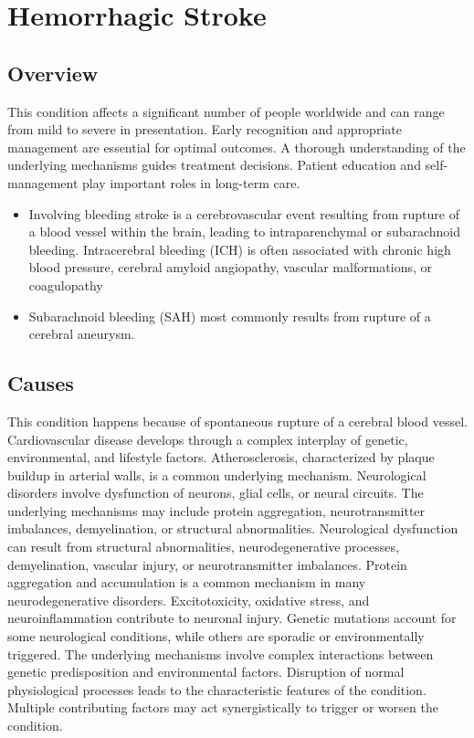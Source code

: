 \chapter{Hemorrhagic Stroke}
\label{sec:Hemorrhagic Stroke}

\section{Overview}
This condition affects a significant number of people worldwide and can range from mild to severe in presentation. Early recognition and appropriate management are essential for optimal outcomes. A thorough understanding of the underlying mechanisms guides treatment decisions. Patient education and self-management play important roles in long-term care.

\begin{itemize}[noitemsep]
  \item Involving bleeding stroke is a cerebrovascular event resulting from rupture of a blood vessel within the brain, leading to intraparenchymal or subarachnoid bleeding. Intracerebral bleeding (ICH) is often associated with chronic high blood pressure, cerebral amyloid angiopathy, vascular malformations, or coagulopathy
  \item Subarachnoid bleeding (SAH) most commonly results from rupture of a cerebral aneurysm.
\end{itemize}
\section{Causes}
This condition happens because of spontaneous rupture of a cerebral blood vessel. Cardiovascular disease develops through a complex interplay of genetic, environmental, and lifestyle factors. Atherosclerosis, characterized by plaque buildup in arterial walls, is a common underlying mechanism. Neurological disorders involve dysfunction of neurons, glial cells, or neural circuits. The underlying mechanisms may include protein aggregation, neurotransmitter imbalances, demyelination, or structural abnormalities. Neurological dysfunction can result from structural abnormalities, neurodegenerative processes, demyelination, vascular injury, or neurotransmitter imbalances. Protein aggregation and accumulation is a common mechanism in many neurodegenerative disorders. Excitotoxicity, oxidative stress, and neuroinflammation contribute to neuronal injury. Genetic mutations account for some neurological conditions, while others are sporadic or environmentally triggered. The underlying mechanisms involve complex interactions between genetic predisposition and environmental factors. Disruption of normal physiological processes leads to the characteristic features of the condition. Multiple contributing factors may act synergistically to trigger or worsen the condition.
